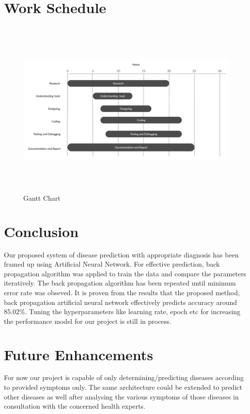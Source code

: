 {\section{Work Schedule}
\begin{figure}[H]
\includegraphics[width=150mm,height=90mm]{images/ganttchartnew.jpg}
 \caption{Gantt Chart}
\end{figure}

\section{Conclusion}
 
Our proposed system of disease prediction with appropriate diagnosis has 
been framed up using Artificial Neural Network. For effective prediction, 
back propagation algorithm was applied to train the data and compare the 
parameters iteratively. The back propagation algorithm has been repeated until 
minimum error rate was obseved. It is proven from the results that the proposed 
method, back propagation artificial neural network effectively predicts accuracy 
around 85.02\%. Tuning the hyperparameters like learning rate, epoch etc for 
increasing the performance model for our project is still in process. 


\section{Future Enhancements}

For now our project is capable of only determining/predicting diseases according to provided
symptoms only. The same architecture could be extended to predict other diseases as well
after analysing the various symptoms of those diseases in consultation with the concerned 
health experts. 

}
